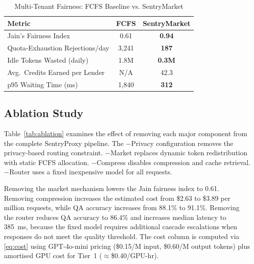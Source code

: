 \documentclass[conference]{IEEEtran}
\begin{document}
\begin{table}[htbp]
\caption{Multi-Tenant Fairness: FCFS Baseline vs. SentryMarket}
\begin{center}
\begin{tabular}{|l|c|c|}
\hline
\textbf{Metric}                     & \textbf{FCFS} & \textbf{SentryMarket} \\
\hline
Jain's Fairness Index \cite{b_jain} & 0.61  & \textbf{0.94}    \\
Quota-Exhaustion Rejections/day     & 3,241 & \textbf{187}     \\
Idle Tokens Wasted (daily)          & 1.8M  & \textbf{0.3M}    \\
Avg.\ Credits Earned per Lender     &  N/A  & 42.3             \\
p95 Waiting Time (ms)               & 1,840 & \textbf{312}     \\
\hline
\end{tabular}
\label{tab:market}
\end{center}
\end{table}

\subsection{Ablation Study}
Table~\ref{tab:ablation} examines the effect of removing each major component from the complete SentryProxy pipeline. The $-$Privacy configuration removes the privacy-based routing constraint. $-$Market replaces dynamic token redistribution with static FCFS allocation. $-$Compress disables compression and cache retrieval. $-$Router uses a fixed inexpensive model for all requests.

Removing the market mechanism lowers the Jain fairness index to 0.61. Removing compression increases the estimated cost from \$2.63 to \$3.89 per million requests, while QA accuracy increases from 88.1\% to 91.1\%. Removing the router reduces QA accuracy to 86.4\% and increases median latency to 385~ms, because the fixed model requires additional cascade escalations when responses do not meet the quality threshold. The cost column is computed via \eqref{eq:cost} using GPT-4o-mini pricing (\$0.15/M input, \$0.60/M output tokens) plus amortised GPU cost for Tier~1 ($\approx$\$0.40/GPU-hr).
\end{document}
